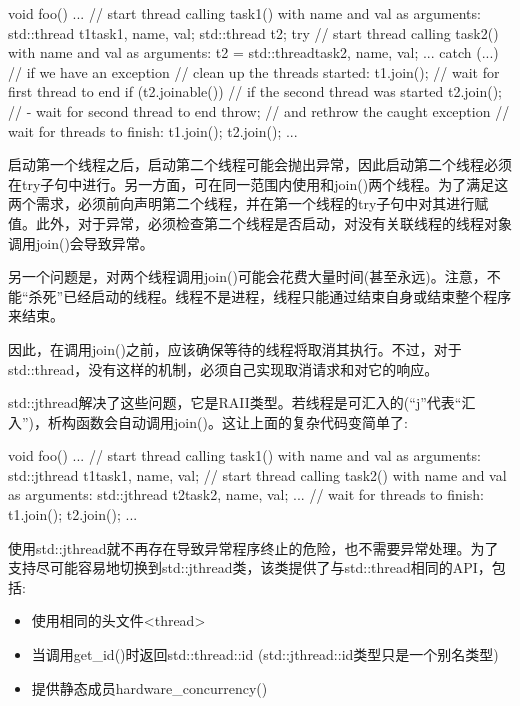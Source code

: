 \begin{cpp}
void foo()
{
	...
	// start thread calling task1() with name and val as arguments:
	std::thread t1{task1, name, val};
	std::thread t2;
	try {
		// start thread calling task2() with name and val as arguments:
		t2 = std::thread{task2, name, val};
		...
	}
	catch (...) { // if we have an exception
		// clean up the threads started:
		t1.join(); // wait for first thread to end
		if (t2.joinable()) { // if the second thread was started
			t2.join(); // - wait for second thread to end
		}
		throw; // and rethrow the caught exception
	}
	// wait for threads to finish:
	t1.join();
	t2.join();
	...
}
\end{cpp}

启动第一个线程之后，启动第二个线程可能会抛出异常，因此启动第二个线程必须在try子句中进行。另一方面，可在同一范围内使用和join()两个线程。为了满足这两个需求，必须前向声明第二个线程，并在第一个线程的try子句中对其进行赋值。此外，对于异常，必须检查第二个线程是否启动，对没有关联线程的线程对象调用join()会导致异常。

另一个问题是，对两个线程调用join()可能会花费大量时间(甚至永远)。注意，不能“杀死”已经启动的线程。线程不是进程，线程只能通过结束自身或结束整个程序来结束。

因此，在调用join()之前，应该确保等待的线程将取消其执行。不过，对于std::thread，没有这样的机制，必须自己实现取消请求和对它的响应。


std::jthread解决了这些问题，它是RAII类型。若线程是可汇入的(“j”代表“汇入”)，析构函数会自动调用join()。这让上面的复杂代码变简单了:

\begin{cpp}
void foo()
{
	...
	// start thread calling task1() with name and val as arguments:
	std::jthread t1{task1, name, val};
	// start thread calling task2() with name and val as arguments:
	std::jthread t2{task2, name, val};
	...
	// wait for threads to finish:
	t1.join();
	t2.join();
	...
}
\end{cpp}

使用std::jthread就不再存在导致异常程序终止的危险，也不需要异常处理。为了支持尽可能容易地切换到std::jthread类，该类提供了与std::thread相同的API，包括:

\begin{itemize}
\item
使用相同的头文件<thread>

\item
当调用get\_id()时返回std::thread::id (std::jthread::id类型只是一个别名类型)

\item
提供静态成员hardware\_concurrency()
\end{itemize}

